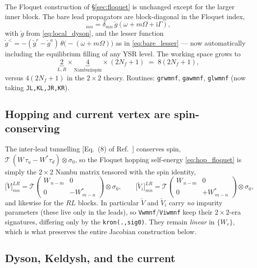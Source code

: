 \documentclass[11pt,a4paper]{article}
\newcommand{\ii}{\mathrm{i}}
\begin{document}
The Floquet construction of \S\ref{sec:floquet} is unchanged except for the
larger inner block.  The bare lead propagators are block-diagonal in the Floquet
index,
\begin{equation}
  [\check g^r]_{mn}=\delta_{mn}\,\check g(\omega+m\Omega+\ii\Gamma),
\end{equation}
with $\check g$ from \eqref{eq:local_dyson}, and the lesser function
$\check g^<=-(\check g^r-\check g^a)\,\theta\!\big(-(\omega+m\Omega)\big)$ as in
\eqref{eq:bare_lesser} --- now automatically including the equilibrium filling of
any YSR level.  The working space grows to
\begin{equation}
  \underbrace{2}_{L,R}\times\underbrace{4}_{\text{Nambu}\otimes\text{spin}}\times(2N_f+1)
  \;=\;8(2N_f+1),
\end{equation}
versus $4(2N_f+1)$ in the $2\times2$ theory.  Routines: \texttt{grwmnf},
\texttt{gawmnf}, \texttt{glwmnf} (now taking \texttt{JL,KL,JR,KR}).

\subsection{Hopping and current vertex are spin-conserving}
\label{sec:ysr_hop}

The inter-lead tunnelling [Eq.~(8) of Ref.~\cite{Lahiri2026YSR}] conserves spin,
$\mathcal T\,(W\,\tau_u-W^{*}\tau_d)\otimes\sigma_0$, so the Floquet hopping
self-energy \eqref{eq:hop_floquet} is simply the $2\times2$ Nambu matrix tensored
with the spin identity,
\begin{equation}
  \big[\check V\big]^{LR}_{mn}
  =\mathcal T\begin{pmatrix}W_{\,n-m}&0\\0&-W^{*}_{\,m-n}\end{pmatrix}\!\otimes\sigma_0,
  \qquad
  \big[\check V_i\big]^{LR}_{mn}
  =\mathcal T\begin{pmatrix}W_{\,n-m}&0\\0&+W^{*}_{\,m-n}\end{pmatrix}\!\otimes\sigma_0,
  \label{eq:hop_4x4}
\end{equation}
and likewise for the $RL$ blocks.  In particular $\check V$ and $\check V_i$ carry
\emph{no} impurity parameters (these live only in the leads), so
\texttt{Vwmnf}/\texttt{Viwmnf} keep their $2\times2$-era signatures, differing
only by the \verb|kron(.,sig0)|.  They remain \emph{linear} in $\{W_r\}$, which
is what preserves the entire Jacobian construction below.

\subsection{Dyson, Keldysh, and the current}
\label{sec:ysr_current}
\end{document}
